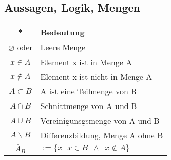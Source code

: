 \begin{multicols}{3}
\subsection*{Aussagen, Logik, Mengen}
\begin{tabularx}{\columnwidth} {
        | >{\raggedright\arraybackslash}c
        | >{\raggedright\arraybackslash}X |}
    \hline
    \textbf{*}            & \textbf{Bedeutung}                                           \\ \hline
    $\varnothing$ oder {} & Leere Menge                        \\ \hline
    $x\in A$              & Element x ist in Menge A                          \\ \hline
    $x\notin A$           & Element x ist nicht in Menge A                    \\ \hline
    $A\subset B$          & A ist eine Teilmenge von B                                   \\ \hline
    $A\cap B$             & Schnittmenge von A und B                                     \\ \hline
    $A\cup B$             & Vereinigunsgsmenge von A und B                               \\ \hline
    $A\backslash B$       & Differenzbildung, Menge A ohne B                         \\\hline
    $\bar{A}_B$           & $:= \{x \,|\, x \in B \enspace \wedge \enspace x \notin A\}$ \\\hline
\end{tabularx}


\def\firstcircle{(0,0) circle (1cm)}
    \def\secondcircle{(0:1.2cm) circle (1cm)}



    \setlength{\parskip}{5mm}


\end{multicols}
